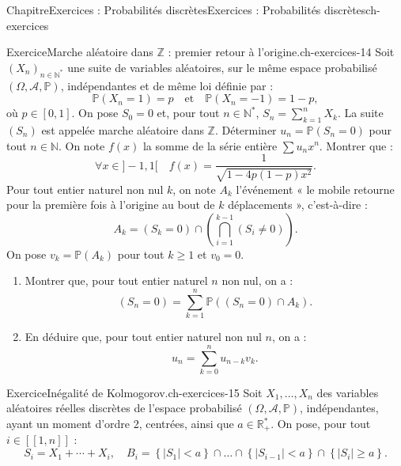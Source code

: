 \documentclass[twoside,10pt,]{book}
\numberwithin{equation}{chapter}
\newcommand{\N}{\mathbb N}
\newcommand{\R}{\mathbb R}
\renewcommand{\Pr}{\mathbb P}
\renewcommand\llbracket{[\![}
\renewcommand\rrbracket{]\!]}
\newcommand{\lt}{<}
\begin{document}
\begin{chapterptx}{Chapitre}{Exercices : Probabilités discrètes}{}{Exercices : Probabilités discrètes}{}{}{ch-exercices}
\begin{inlineexercise}{Exercice}{Marche aléatoire dans \(\mathbb{Z}\) : premier retour à l'origine.}{ch-exercices-14}
Soit \((X_{n})_{n \in \N^{*}}\) une suite de variables aléatoires, sur le même espace probabilisé \((\Omega, \mathcal{A}, \Pr)\), indépendantes et de même loi définie par :%
\begin{equation*}
\Pr(X_{n} = 1) = p \quad \text{et} \quad \Pr(X_{n} = -1) = 1 - p,
\end{equation*}
où \(p \in [0, 1]\). On pose \(S_{0} = 0\) et, pour tout \(n \in \N^{*}\), \(S_{n} = \sum_{k=1}^{n} X_{k}\). La suite \((S_{n})\) est appelée marche aléatoire dans \(\mathbb{Z}\).%
Déterminer \(u_{n} = \Pr(S_{n} = 0)\) pour tout \(n \in \N\).%
On note \(f(x)\) la somme de la série entière \(\sum u_{n} x^{n}\). Montrer que :%
\begin{equation*}
\forall x \in ]-1, 1[ \quad f(x) = \frac{1}{\sqrt{1 - 4 p (1 - p) x^{2}}}.
\end{equation*}
%
Pour tout entier naturel non nul \(k\), on note \(A_{k}\) l'événement « le mobile retourne pour la première fois à l'origine au bout de \(k\) déplacements », c'est-à-dire :%
\begin{equation*}
A_{k} = (S_{k} = 0) \cap \left(\bigcap_{i=1}^{k-1} (S_{i} \neq 0)\right).
\end{equation*}
On pose \(v_{k} = \Pr(A_{k})\) pour tout \(k \geqslant 1\) et \(v_{0} = 0\).%
%
\begin{enumerate}[label={\arabic*.}]
\item{}Montrer que, pour tout entier naturel \(n\) non nul, on a :%
\begin{equation*}
(S_{n} = 0) = \sum_{k=1}^{n} \Pr((S_{n} = 0) \cap A_{k}).
\end{equation*}
%
\item{}En déduire que, pour tout entier naturel non nul \(n\), on a :%
\begin{equation*}
u_{n} = \sum_{k=0}^{n} u_{n - k} v_{k}.
\end{equation*}
%
\end{enumerate}
\end{inlineexercise}%
\begin{inlineexercise}{Exercice}{Inégalité de Kolmogorov.}{ch-exercices-15}%
Soit \(X_{1}, \ldots, X_{n}\) des variables aléatoires réelles discrètes de l'espace probabilisé \((\Omega, \mathcal{A}, \Pr)\), indépendantes, ayant un moment d'ordre 2, centrées, ainsi que \(a \in \R_{+}^{*}\). On pose, pour tout \(i \in \llbracket 1, n \rrbracket\) :%
\begin{equation*}
S_{i} = X_{1} + \cdots + X_{i}, \quad B_{i} = \left\{\left|S_{1}\right| \lt a\right\} \cap \ldots \cap \left\{\left|S_{i-1}\right| \lt a\right\} \cap \left\{\left|S_{i}\right| \geqslant a\right\}.

\end{equation*}
\end{inlineexercise}
\end{chapterptx}
\end{document}
